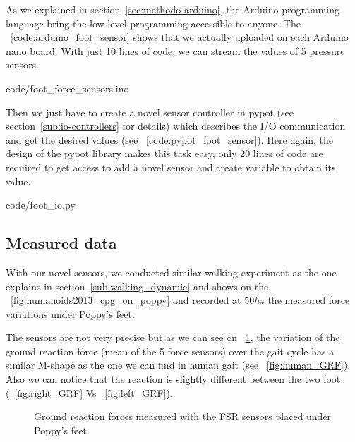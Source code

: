 As we explained in section~\ref{sec:methodo-arduino}, the Arduino programming language bring the low-level programming accessible to anyone. The \codename~\ref{code:arduino_foot_sensor} shows that we actually uploaded on each Arduino nano board. With just 10 lines of code, we can stream the values of 5 pressure sensors.


    {code/foot_force_sensors.ino}

Then we just have to create a novel sensor controller in pypot (see section~\ref{sub:io-controllers} for details) which describes the I/O communication and get the desired values (see \codename~\ref{code:pypot_foot_sensor}). Here again, the design of the pypot library makes this task easy, only 20 lines of code are required to get access to add a novel sensor and create variable to obtain its value.


    {code/foot_io.py}


\subsection{Measured data} %
With our novel sensors, we conducted similar walking experiment as the one explains in section~\ref{sub:walking_dynamic} and shows on the \figurename~\ref{fig:humanoids2013_cpg_on_poppy} and recorded at $50hz$ the measured force variations under Poppy's feet.

The sensors are not very precise but as we can see on \figurename~\ref{fig:poppy_GRF}, the variation of the ground reaction force (mean of the 5 force sensors) over the gait cycle has a similar M-shape as the one we can find in human gait (see \figurename~\ref{fig:human_GRF}). Also we can notice that the reaction is slightly different between the two foot (\figurename~\ref{fig:right_GRF} Vs \figurename~\ref{fig:left_GRF}).

\begin{figure}[!ht]
\centering
    \hfil
    \caption{Ground reaction forces measured with the FSR sensors placed under Poppy's feet.}
    \label{fig:poppy_GRF}
\end{figure}


